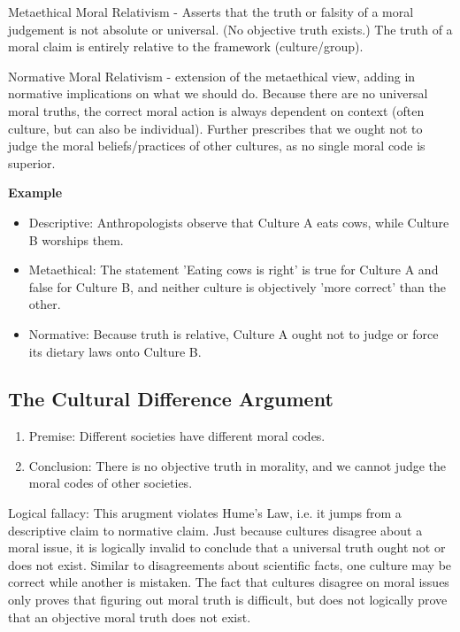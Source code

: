 \documentclass[12pt]{article}
\begin{document}
\noindent Metaethical Moral Relativism - Asserts that the truth or falsity of a moral judgement is not absolute or universal. (No objective truth exists.)
The truth of a moral claim is entirely relative to the framework (culture/group).

\noindent Normative Moral Relativism - extension of the metaethical view, adding in normative implications on what we should do.
Because there are no universal moral truths, the correct moral action is always dependent on context (often culture, but can also be individual).
Further prescribes that we ought not to judge the moral beliefs/practices of other cultures, as no single moral code is superior.

\noindent\textbf{Example}
\begin{itemize}
    \item Descriptive: Anthropologists observe that Culture A eats cows, while Culture B worships them.
    \item Metaethical: The statement 'Eating cows is right' is true for Culture A and false for Culture B, and neither culture is objectively 'more correct' than the other.
    \item Normative: Because truth is relative, Culture A ought not to judge or force its dietary laws onto Culture B.
\end{itemize}

\subsection{The Cultural Difference Argument}
\begin{enumerate}
    \item Premise: Different societies have different moral codes.
    \item Conclusion: There is no objective truth in morality, and we cannot judge the moral codes of other societies.
\end{enumerate}
Logical fallacy: This arugment violates Hume's Law, i.e. it jumps from a descriptive claim to normative claim.
Just because cultures disagree about a moral issue, it is logically invalid to conclude that a universal truth ought not or does not exist.
Similar to disagreements about scientific facts, one culture may be correct while another is mistaken.
The fact that cultures disagree on moral issues only proves that figuring out moral truth is difficult, but does not logically prove that an objective moral truth does not exist.
\end{document}
